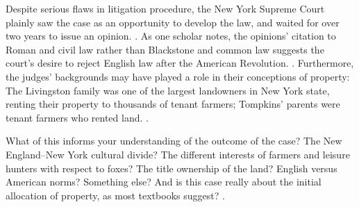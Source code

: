Despite serious flaws in litigation procedure, the New York Supreme Court
plainly saw the case as an opportunity to develop the law, and waited for over
two years to issue an opinion. . As one
scholar notes, the opinions' citation to Roman and civil law rather than
Blackstone and common law suggests the court's desire to reject English law
after the American Revolution. . Furthermore,
the judges' backgrounds may have played a role in their conceptions of property:
The Livingston family was one of the largest landowners in New York state,
renting their property to thousands of tenant farmers; Tompkins' parents were
tenant farmers who rented land. .

What of this informs your understanding of the outcome of the case? The New
England--New York cultural divide? The different interests of farmers and
leisure hunters with respect to foxes? The title ownership of the land? English
versus American norms? Something else? And is this case really about the initial
allocation of property, as most textbooks suggest? .
